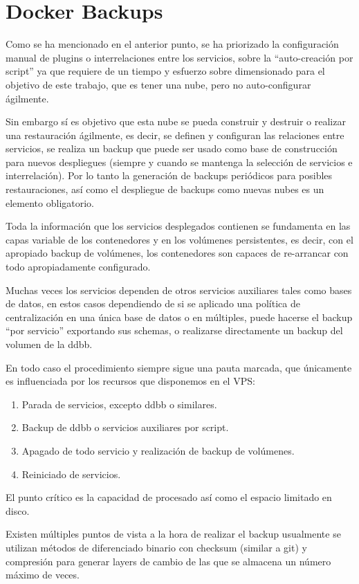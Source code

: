 \section{Docker Backups}
Como se ha mencionado en el anterior punto, se ha priorizado la configuración manual de plugins o interrelaciones entre los servicios, sobre la “auto-creación por script” ya que requiere de un tiempo y esfuerzo sobre dimensionado para el objetivo de este trabajo, que es tener una nube, pero no auto-configurar ágilmente.

Sin embargo sí es objetivo que esta nube se pueda construir y destruir o realizar una restauración ágilmente, es decir, se definen y configuran las relaciones entre servicios, se realiza un backup que puede ser usado como base de construcción para nuevos despliegues (siempre y cuando se mantenga la selección de servicios e interrelación). Por lo tanto la generación de backups periódicos para posibles restauraciones, así como el despliegue de backups como nuevas nubes es un elemento obligatorio.

Toda la información que los servicios desplegados contienen se fundamenta en las capas variable de los contenedores y en los volúmenes persistentes, es decir, con el apropiado backup de volúmenes, los contenedores son capaces de re-arrancar con todo apropiadamente configurado. 

Muchas veces los servicios dependen de otros servicios auxiliares tales como bases de datos, en estos casos dependiendo de si se aplicado una política de centralización en una única base de datos o en múltiples, puede hacerse el backup “por servicio” exportando sus schemas, o realizarse directamente un backup del volumen de la ddbb.

En todo caso el procedimiento siempre sigue una pauta marcada, que únicamente es influenciada por los recursos que disponemos en el VPS:
\begin{enumerate}
    \item Parada de servicios, excepto ddbb o similares.
    \item Backup de ddbb o servicios auxiliares por script.
    \item Apagado de todo servicio y realización de backup de volúmenes.
    \item Reiniciado de servicios.
\end{enumerate}


El punto crítico es la capacidad de procesado así como el espacio limitado en disco. 

Existen múltiples puntos de vista a la hora de realizar el backup usualmente se utilizan métodos de diferenciado binario con checksum (similar a git) y compresión para generar layers de cambio de las que se almacena un número máximo de veces. 

